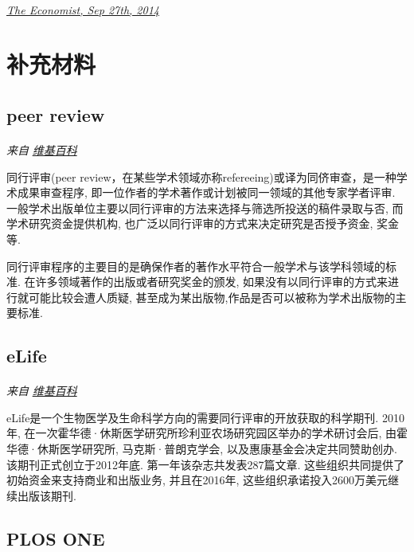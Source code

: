 \documentclass[a4paper, 12pt, UTF8]{article}
\begin{document}
\paragraph*{}
    \href{https://www.economist.com/science-and-technology/2014/09/27/grand-openings}{\emph{\small The Economist, Sep 27th, 2014}}


\newpage
\section{补充材料}
\subsection{peer review}
\paragraph*{}
    \emph{\small 来自} \href{https://zh.wikipedia.org/wiki/同行評審}{\emph{\small 维基百科}}

同行评审(peer review，在某些学术领域亦称refereeing)或译为同侪审查，是一种学术成果审查程序, 即一位作者的学术著作或计划被同一领域的其他专家学者评审. 一般学术出版单位主要以同行评审的方法来选择与筛选所投送的稿件录取与否, 而学术研究资金提供机构, 也广泛以同行评审的方式来决定研究是否授予资金, 奖金等.

同行评审程序的主要目的是确保作者的著作水平符合一般学术与该学科领域的标准. 在许多领域著作的出版或者研究奖金的颁发, 如果没有以同行评审的方式来进行就可能比较会遭人质疑, 甚至成为某出版物,作品是否可以被称为学术出版物的主要标准.

\subsection{eLife}
\paragraph*{}
    \emph{\small 来自} \href{https://zh.wikipedia.org/wiki/ELife}{\emph{\small 维基百科}}

eLife是一个生物医学及生命科学方向的需要同行评审的开放获取的科学期刊. 2010年, 在一次霍华德·休斯医学研究所珍利亚农场研究园区举办的学术研讨会后, 由霍华德·休斯医学研究所, 马克斯·普朗克学会, 以及惠康基金会决定共同赞助创办. 该期刊正式创立于2012年底. 第一年该杂志共发表287篇文章. 这些组织共同提供了初始资金来支持商业和出版业务, 并且在2016年, 这些组织承诺投入2600万美元继续出版该期刊.

\subsection{PLOS ONE}
\end{document}
